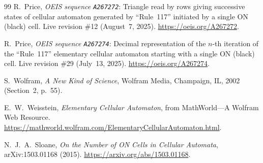 \documentclass[11pt]{article}
\theoremstyle{definition}
\newcommand{\seq}[1]{\texttt{#1}}
\begin{document}
{\begin{thebibliography}{99}
R.\ Price, \emph{OEIS sequence \seq{A267272}}: Triangle read by rows giving successive states of cellular automaton generated by ``Rule~117'' initiated by a single ON (black) cell. Live revision \#12 (August~7, 2025). \url{https://oeis.org/A267272}.

R.\ Price, \emph{OEIS sequence \seq{A267274}}: Decimal representation of the $n$-th iteration of the ``Rule~117'' elementary cellular automaton starting with a single ON (black) cell. Live revision \#29 (July~13, 2025). \url{https://oeis.org/A267274}.

S.\ Wolfram, \emph{A New Kind of Science}, Wolfram Media, Champaign, IL, 2002 (Section~2, p.~55).

E.~W.\ Weisstein, \emph{Elementary Cellular Automaton}, from MathWorld---A Wolfram Web Resource. \url{https://mathworld.wolfram.com/ElementaryCellularAutomaton.html}.

N.~J.~A.\ Sloane, \emph{On the Number of ON Cells in Cellular Automata}, arXiv:1503.01168 (2015). \url{https://arxiv.org/abs/1503.01168}.

\end{thebibliography}
}
\end{document}
